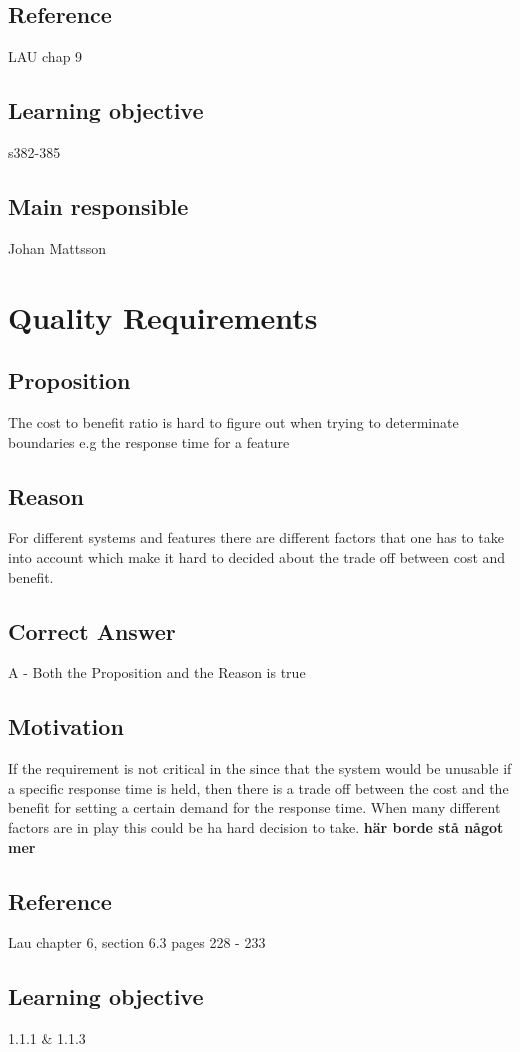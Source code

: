 \documentclass[a4paper]{article}
\begin{document}
\subsection*{Reference}
LAU chap 9
\subsection*{Learning objective}
s382-385
\subsection*{Main responsible}
Johan Mattsson


\section{Quality Requirements}
\subsection*{Proposition}
The cost to benefit ratio is hard to figure out when trying to determinate boundaries e.g the response time for a feature
\subsection*{Reason}
For different systems and features there are different factors that one has to take into account which make it hard to decided about the trade off between cost and benefit.
\subsection*{Correct Answer}
A - Both the Proposition and the Reason is true
\subsection*{Motivation}
If the requirement is not critical in the since that the system would be unusable if a specific response time is held, then there is a trade off between the cost and the benefit for setting a certain demand for the response time. When many different factors are in play this could be ha hard decision to take. \textbf{här borde stå något mer}
\subsection*{Reference}
Lau chapter 6, section 6.3 pages 228 - 233
\subsection*{Learning objective}
1.1.1 \& 1.1.3
\end{document}
